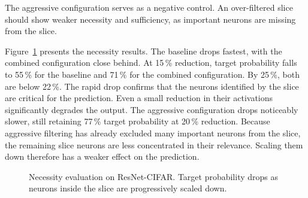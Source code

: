 \documentclass[
12pt,
fancyheadings,
a4paper,
twoside,
BCOR=0.7cm,
nobcorignoretitle,
grayscalebody,
]{stsreprt}
\begin{document}
The aggressive configuration serves as a negative control. An over-filtered slice should show
weaker necessity and sufficiency, as important neurons are missing from the slice.

Figure~\ref{fig:counterfactual_necessity} presents the necessity results.
The baseline drops fastest, with the combined configuration close behind.
At 15\,\% reduction, target probability falls to 55\,\% for the baseline and 71\,\% for the
combined configuration.
By 25\,\%, both are below 22\,\%.
The rapid drop confirms that the neurons identified by the slice are critical for the prediction.
Even a small reduction in their activations significantly degrades the output.
The aggressive configuration drops noticeably slower, still retaining 77\,\% target probability at
20\,\% reduction.
Because aggressive filtering has already excluded many important neurons from the slice, the
remaining slice neurons are less concentrated in their relevance. Scaling them down therefore has a
weaker effect on the prediction.

\begin{figure}[ht]
\centering
{}
\caption{Necessity evaluation on ResNet-CIFAR. Target probability drops as neurons inside the slice are progressively scaled down.}
\label{fig:counterfactual_necessity}
\end{figure}
\end{document}

